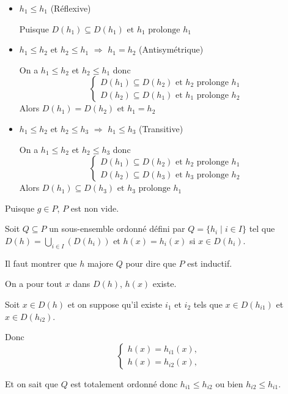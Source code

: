 \documentclass{article}
\theoremstyle{definition}
\theoremstyle{plain}
\begin{document}
\begin{itemize}
    \item $h_1 \leq h_1$ (Réflexive)
    
    Puisque $D(h_1) \subseteq D(h_1) \text{ et } h_1 \text{ prolonge } h_1$
    \item $h_1 \leq h_2$ et $h_2 \leq h_1$ $\Rightarrow$ $h_1 = h_2$ (Antisymétrique)
    
    On a $h_1 \leq h_2$ et $h_2 \leq h_1$
    donc
    \[
    \begin{cases}
        D(h_1) \subseteq D(h_2) \text{ et } h_2 \text{ prolonge } h_1 \\ 
        D(h_2) \subseteq D(h_1) \text{ et } h_1 \text{ prolonge } h_2
        
    \end{cases} 
    \]
    Alors $D(h_1) = D(h_2) \text{ et } h_1 = h_2$
    \item $h_1 \leq h_2$ et $h_2 \leq h_3$ $\Rightarrow$ $h_1 \leq h_3$ (Transitive)

    On a $h_1 \leq h_2$ et $h_2 \leq h_3$
    donc 
    \[
    \begin{cases}
        D(h_1) \subseteq D(h_2) \text{ et } h_2 \text{ prolonge } h_1 \\ 
        D(h_2) \subseteq D(h_3) \text{ et } h_3 \text{ prolonge } h_2
    \end{cases} 
    \]
    Alors $D(h_1) \subseteq D(h_3) \text { et } h_3 \text { prolonge } h_1$
    
\end{itemize}

Puisque $g \in P$, $P$ est non vide.

Soit $Q \subseteq P$ un sous-ensemble ordonné défini par $Q = \{ h_i \mid i \in I \}$ tel que $D(h) = \bigcup_{i \in I} (D(h_i))$ et $h(x) = h_i(x)$ si $x \in D(h_i)$.

Il faut montrer que $h$ majore $Q$ pour dire que $P$ est inductif.

On a pour tout $x$ dans $D(h)$, $h(x)$ existe. 

Soit $x \in D(h)$ et on suppose qu'il existe $i_1$ et $i_2$ tels que $x \in D(h_{i1})$ et $x \in D(h_{i2})$.

Donc 
\[
\begin{cases}
    h(x) = h_{i1}(x), \\
    h(x) = h_{i2}(x),
\end{cases}
\]

Et on sait que $Q$ est totalement ordonné donc $h_{i1} \leq h_{i2}$ ou bien $h_{i2} \leq h_{i1}$.
\end{document}
